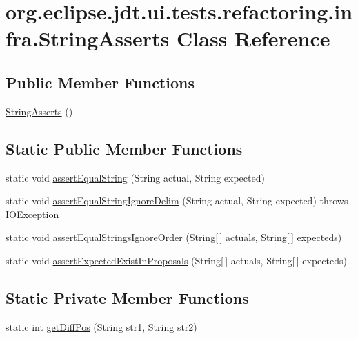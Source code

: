 \hypertarget{classorg_1_1eclipse_1_1jdt_1_1ui_1_1tests_1_1refactoring_1_1infra_1_1StringAsserts}{
\section{org.eclipse.jdt.ui.tests.refactoring.infra.StringAsserts Class Reference}
\label{classorg_1_1eclipse_1_1jdt_1_1ui_1_1tests_1_1refactoring_1_1infra_1_1StringAsserts}
}
\subsection*{Public Member Functions}
\begin{DoxyCompactItemize}
\item 
\hyperlink{classorg_1_1eclipse_1_1jdt_1_1ui_1_1tests_1_1refactoring_1_1infra_1_1StringAsserts_a70bb260374c867015a4573fa176e385d}{StringAsserts} ()
\end{DoxyCompactItemize}
\subsection*{Static Public Member Functions}
\begin{DoxyCompactItemize}
\item 
static void \hyperlink{classorg_1_1eclipse_1_1jdt_1_1ui_1_1tests_1_1refactoring_1_1infra_1_1StringAsserts_a785ade49386860cb3c69128f4f968317}{assertEqualString} (String actual, String expected)
\item 
static void \hyperlink{classorg_1_1eclipse_1_1jdt_1_1ui_1_1tests_1_1refactoring_1_1infra_1_1StringAsserts_a7a490fd191bfe1d8b03194644d5b3d95}{assertEqualStringIgnoreDelim} (String actual, String expected)  throws IOException 
\item 
static void \hyperlink{classorg_1_1eclipse_1_1jdt_1_1ui_1_1tests_1_1refactoring_1_1infra_1_1StringAsserts_a0cbb5233a262eb61015e227f86ee0334}{assertEqualStringsIgnoreOrder} (String\mbox{[}$\,$\mbox{]} actuals, String\mbox{[}$\,$\mbox{]} expecteds)
\item 
static void \hyperlink{classorg_1_1eclipse_1_1jdt_1_1ui_1_1tests_1_1refactoring_1_1infra_1_1StringAsserts_acbdcf72bc2650de67e1dae5ad3245b8b}{assertExpectedExistInProposals} (String\mbox{[}$\,$\mbox{]} actuals, String\mbox{[}$\,$\mbox{]} expecteds)
\end{DoxyCompactItemize}
\subsection*{Static Private Member Functions}
\begin{DoxyCompactItemize}
\item 
static int \hyperlink{classorg_1_1eclipse_1_1jdt_1_1ui_1_1tests_1_1refactoring_1_1infra_1_1StringAsserts_ace50c1356bb3298c13edfdfddd0a186f}{getDiffPos} (String str1, String str2)
\end{DoxyCompactItemize}
